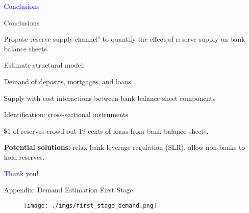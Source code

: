 \documentclass[notes,11pt, aspectratio=169]{beamer}
\newenvironment{wideitemize}{\itemize\addtolength{\itemsep}{10pt}}{\enditemize}
\begin{document}
      \begin{frame}
        \textcolor{blue}{\huge{\centerline{Conclusions}}}
    \end{frame}
    

      \begin{frame}{Conclusions}
        \vspace{0.5cm}
        \begin{wideitemize}
        \item Propose reserve supply channel" to quantify the effect of reserve supply on bank balance sheets.
        \item   Estimate structural model:
        \begin{wideitemize}
            \item Demand of deposits, mortgages, and loans
            \item  Supply with cost interactions between bank balance sheet components
            \item  Identification: cross-sectional instruments
        \end{wideitemize}
                        
            \item   $\$ 1$ of reserves crowd out 19 cents of loans from bank balance sheets.
            \item \textbf{Potential solutions:} relax bank leverage regulation (SLR), allow non-banks to hold reserves.
                    \end{wideitemize}
                    
\end{frame}

\begin{frame}
\textcolor{blue}{\huge{\centerline{Thank you!}}}
\end{frame}

%    
%    


\appendix

\begin{frame}[label=firststage]{Appendix: Demand Estimation First Stage \hyperlink{demand}{}}
    \vspace{0.5cm}
      
        \begin{figure}[t*]
          \centering
    
          \texttt{[image: ./imgs/first\_stage\_demand.png]}
        \end{figure}
        
      \end{frame}
\end{document}
